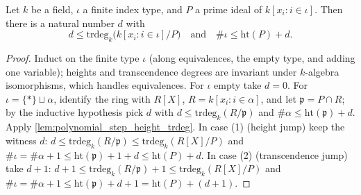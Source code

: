 \begin{theorem}
  \label{thm:trdeg_height_polynomial}
  \leanok
  Let \(k\) be a field, \(\iota\) a finite index type, and \(P\) a prime ideal of
  \(k[x_i : i \in \iota]\). Then there is a natural number \(d\) with
  \[
    d \leq \mathrm{trdeg}_k\bigl(k[x_i : i \in \iota]/P\bigr)
    \quad\text{and}\quad
    \#\iota \leq \mathrm{ht}(P) + d.
  \]
\end{theorem}
\begin{proof}
  \leanok
  Induct on the finite type \(\iota\) (along equivalences, the empty type, and adding
  one variable); heights and transcendence degrees are invariant under \(k\)-algebra
  isomorphisms, which handles equivalences. For \(\iota\) empty take \(d = 0\). For
  \(\iota = \{*\} \sqcup \alpha\), identify the ring with \(R[X]\),
  \(R = k[x_i : i \in \alpha]\), and let \(\mathfrak p = P \cap R\); by the inductive
  hypothesis pick \(d\) with \(d \leq \mathrm{trdeg}_k(R/\mathfrak p)\) and
  \(\#\alpha \leq \mathrm{ht}(\mathfrak p) + d\). Apply
  \ref{lem:polynomial_step_height_trdeg}. In case (1) (height jump) keep the witness
  \(d\):
  \(d \leq \mathrm{trdeg}_k(R/\mathfrak p) \leq \mathrm{trdeg}_k(R[X]/P)\) and
  \(\#\iota = \#\alpha + 1 \leq \mathrm{ht}(\mathfrak p) + 1 + d \leq
  \mathrm{ht}(P) + d\). In case (2) (transcendence jump) take \(d + 1\):
  \(d + 1 \leq \mathrm{trdeg}_k(R/\mathfrak p) + 1 \leq \mathrm{trdeg}_k(R[X]/P)\) and
  \(\#\iota = \#\alpha + 1 \leq \mathrm{ht}(\mathfrak p) + d + 1 = \mathrm{ht}(P) +
  (d + 1)\).
\end{proof}

